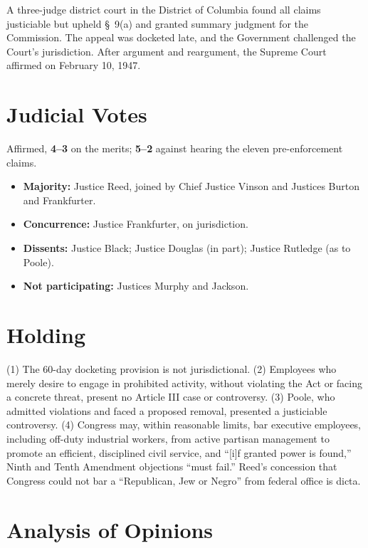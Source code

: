 \documentclass[12pt]{article}
\begin{document}
A three-judge district court in the District of Columbia found all claims justiciable but upheld \S~9(a) and granted summary judgment for the Commission. The appeal was docketed late, and the Government challenged the Court's jurisdiction. After argument and reargument, the Supreme Court affirmed on February 10, 1947.

\section{Judicial Votes}

Affirmed, \textbf{4--3} on the merits; \textbf{5--2} against hearing the eleven pre-enforcement claims.
\begin{itemize}
\item \textbf{Majority:} Justice Reed, joined by Chief Justice Vinson and Justices Burton and Frankfurter.
\item \textbf{Concurrence:} Justice Frankfurter, on jurisdiction.
\item \textbf{Dissents:} Justice Black; Justice Douglas (in part); Justice Rutledge (as to Poole).
\item \textbf{Not participating:} Justices Murphy and Jackson.
\end{itemize}

\section{Holding}

(1) The 60-day docketing provision is not jurisdictional. (2) Employees who merely desire to engage in prohibited activity, without violating the Act or facing a concrete threat, present no Article III case or controversy. (3) Poole, who admitted violations and faced a proposed removal, presented a justiciable controversy. (4) Congress may, within reasonable limits, bar executive employees, including off-duty industrial workers, from active partisan management to promote an efficient, disciplined civil service, and ``[i]f granted power is found,'' Ninth and Tenth Amendment objections ``must fail.'' Reed's concession that Congress could not bar a ``Republican, Jew or Negro'' from federal office is dicta.

\section{Analysis of Opinions}
\end{document}
